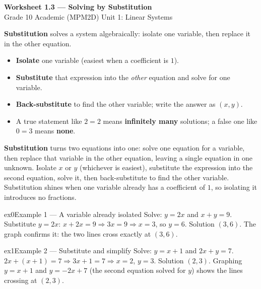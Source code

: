 \documentclass[11pt]{article}
\begin{document}
\begin{center}
{\LARGE\bfseries\color{titleblue}Worksheet 1.3 --- Solving by Substitution}\\[2pt]
{\small Grade 10 Academic (MPM2D) \textperiodcentered{} Unit 1: Linear Systems}
\end{center}

\begin{ideabox}
\textbf{Substitution} solves a system algebraically: isolate one variable, then replace it in the other equation.
\begin{itemize}[leftmargin=*,itemsep=2pt]
  \item \textbf{Isolate} one variable (easiest when a coefficient is $1$).
  \item \textbf{Substitute} that expression into the \emph{other} equation and solve for one variable.
  \item \textbf{Back-substitute} to find the other variable; write the answer as $(x,y)$.
  \item A true statement like $2=2$ means \textbf{infinitely many} solutions; a false one like $0=3$ means \textbf{none}.
\end{itemize}
\end{ideabox}

\begin{learnbox}
\textbf{Substitution} turns two equations into one: solve one equation for a variable, then replace that variable in the other equation, leaving a single equation in one unknown.
Isolate $x$ or $y$ (whichever is easiest), substitute the expression into the second equation, solve it, then back-substitute to find the other variable.
Substitution shines when one variable already has a coefficient of $1$, so isolating it introduces no fractions.
\end{learnbox}


\begin{example}{ex0}{Example 1 --- A variable already isolated}
Solve: $y=2x$ and $x+y=9$.
\soln Substitute $y=2x$: $x+2x=9\Rightarrow 3x=9\Rightarrow x=3$, so $y=6$. Solution $(3,6)$. The graph confirms it: the two lines cross exactly at $(3,6)$.
\end{example}

\begin{example}{ex1}{Example 2 --- Substitute and simplify}
Solve: $y=x+1$ and $2x+y=7$.
\soln $2x+(x+1)=7\Rightarrow 3x+1=7\Rightarrow x=2$, $y=3$. Solution $(2,3)$. Graphing $y=x+1$ and $y=-2x+7$ (the second equation solved for $y$) shows the lines crossing at $(2,3)$.
\end{example}
\end{document}
